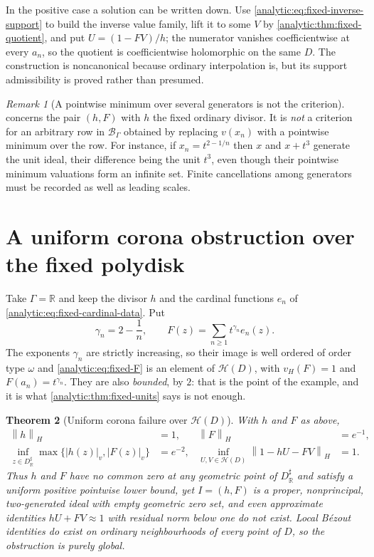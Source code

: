 \documentclass[11pt,letterpaper]{article}
\newtheorem{theorem}{Theorem}[section]
\theoremstyle{definition}
\theoremstyle{remark}
\newtheorem{remark}[theorem]{Remark}
\newcommand{\R}{\mathbb R}
\newcommand{\HH}{\mathcal H}
\newcommand{\BB}{\mathcal B}
\newcommand{\norm}[1]{\left\lVert#1\right\rVert}
\newcommand{\vH}{v_{\!H}}
\numberwithin{equation}{section}
\begin{document}
In the positive case a solution can be written down. Use
\eqref{analytic:eq:fixed-inverse-support} to build the inverse value
family, lift it to some $V$ by \cref{analytic:thm:fixed-quotient}, and put
$U=(1-FV)/h$; the numerator vanishes coefficientwise at every $a_n$, so the
quotient is coefficientwise holomorphic on the same $D$. The construction
is noncanonical because ordinary interpolation is, but its support
admissibility is proved rather than presumed.

\begin{remark}[A pointwise minimum over several generators is not the
criterion]\label{analytic:rem:fixed-minimum}
 concerns the pair $(h,F)$ with $h$ the
fixed ordinary divisor. It is \emph{not} a criterion for an arbitrary row
in $\BB_\Gamma$ obtained by replacing $v(x_n)$ with a pointwise minimum
over the row. For instance, if $x_n=t^{2-1/n}$ then $x$ and $x+t^3$
generate the unit ideal, their difference being the unit $t^3$, even though
their pointwise minimum valuations form an infinite set. Finite
cancellations among generators must be recorded as well as leading scales.
\end{remark}
\section{A uniform corona obstruction over the fixed polydisk}
\label{analytic:sec:fixed-corona}

Take $\Gamma=\R$ and keep the divisor $h$ and the cardinal functions $e_n$
of \eqref{analytic:eq:fixed-cardinal-data}. Put
\begin{equation}\label{analytic:eq:fixed-F}
 \gamma_n=2-\frac1n,\qquad
 F(z)=\sum_{n\ge1}t^{\gamma_n}e_n(z).
\end{equation}
The exponents $\gamma_n$ are strictly increasing, so their image is well
ordered of order type $\omega$ and \eqref{analytic:eq:fixed-F} is an
element of $\HH(D)$, with $\vH(F)=1$ and $F(a_n)=t^{\gamma_n}$. They are
also \emph{bounded}, by $2$: that is the point of the example, and it is
what \cref{analytic:thm:fixed-units} says is not enough.

\begin{theorem}[Uniform corona failure over $\HH(D)$]
\label{analytic:thm:fixed-corona}
With $h$ and $F$ as above,
\begin{align*}
 \norm{h}_H&=1, & \norm{F}_H&=e^{-1},\\
 \inf_{z\in D^\sharp_\R}\max\{|h(z)|_v,|F(z)|_v\}&=e^{-2}, &
 \inf_{U,V\in\HH(D)}\norm{1-hU-FV}_H&=1 .
\end{align*}
Thus $h$ and $F$ have no common zero at any geometric point of
$D^\sharp_\R$ and satisfy a uniform positive pointwise lower bound, yet
$I=(h,F)$ is a proper, nonprincipal, two-generated ideal with empty
geometric zero set, and even approximate identities $hU+FV\approx1$ with
residual norm below one do not exist. Local B\'ezout identities do exist on
ordinary neighbourhoods of every point of $D$, so the obstruction is
purely global.
\end{theorem}
\end{document}
